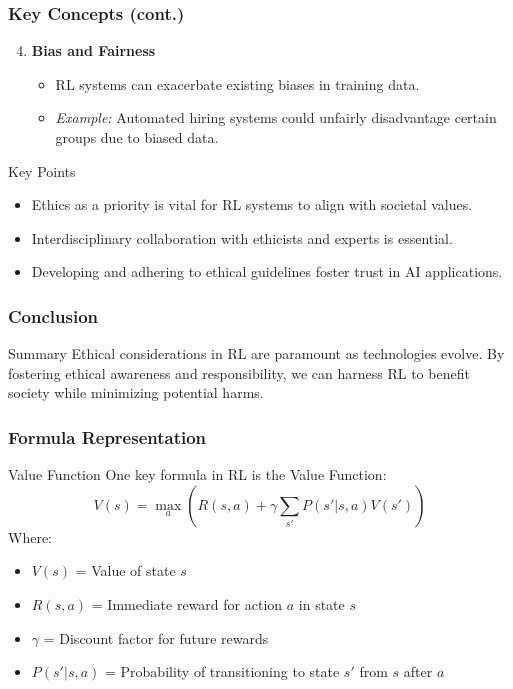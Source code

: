 \documentclass[aspectratio=169]{beamer}
\begin{document}
\begin{frame}[fragile]
    \frametitle{Key Concepts (cont.)}
    \begin{enumerate}
        \setcounter{enumi}{3} %
        \item \textbf{Bias and Fairness}
        \begin{itemize}
            \item RL systems can exacerbate existing biases in training data.
            \item \textit{Example:} Automated hiring systems could unfairly disadvantage certain groups due to biased data.
        \end{itemize}
    \end{enumerate}

    \begin{block}{Key Points}
        \begin{itemize}
            \item Ethics as a priority is vital for RL systems to align with societal values.
            \item Interdisciplinary collaboration with ethicists and experts is essential.
            \item Developing and adhering to ethical guidelines foster trust in AI applications.
        \end{itemize}
    \end{block}
\end{frame}

\begin{frame}[fragile]
    \frametitle{Conclusion}
    \begin{block}{Summary}
        Ethical considerations in RL are paramount as technologies evolve. By fostering ethical awareness and responsibility, we can harness RL to benefit society while minimizing potential harms.
    \end{block}
\end{frame}

\begin{frame}[fragile]
    \frametitle{Formula Representation}
    \begin{block}{Value Function}
        One key formula in RL is the Value Function:
        \begin{equation}
            V(s) = \max_a \left( R(s, a) + \gamma \sum_{s'} P(s' | s, a) V(s') \right)
        \end{equation}
        Where:
        \begin{itemize}
            \item \( V(s) \) = Value of state \( s \)
            \item \( R(s, a) \) = Immediate reward for action \( a \) in state \( s \)
            \item \( \gamma \) = Discount factor for future rewards
            \item \( P(s' | s, a) \) = Probability of transitioning to state \( s' \) from \( s \) after \( a \)
        \end{itemize}
    \end{block}
\end{frame}
\end{document}
